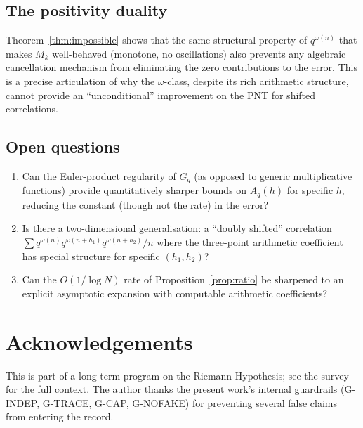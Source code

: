 \documentclass[11pt]{amsart}
\theoremstyle{definition}
\theoremstyle{remark}
\newcommand{\om}{\omega}
\begin{document}
\subsection{The positivity duality}

Theorem~\ref{thm:impossible} shows that the same structural property of $q^{\om(n)}$
that makes $M_k$ well-behaved (monotone, no oscillations) also prevents any algebraic
cancellation mechanism from eliminating the zero contributions to the error.
This is a precise articulation of why the $\om$-class, despite its rich arithmetic
structure, cannot provide an ``unconditional'' improvement on the PNT for shifted
correlations.

\subsection{Open questions}

\begin{enumerate}
\item Can the Euler-product regularity of $G_q$ (as opposed to generic multiplicative
  functions) provide quantitatively sharper bounds on $A_q(h)$ for specific $h$,
  reducing the constant (though not the rate) in the error?
\item \sloppy Is there a two-dimensional generalisation: a ``doubly shifted'' correlation
  $\sum q^{\om(n)}q^{\om(n+h_1)}q^{\om(n+h_2)}/n$ where the three-point arithmetic
  coefficient has special structure for specific $(h_1,h_2)$?
\item Can the $O(1/\log N)$ rate of Proposition~\ref{prop:ratio} be sharpened to
  an explicit asymptotic expansion with computable arithmetic coefficients?
\end{enumerate}

\section*{Acknowledgements}

This is part of a long-term program on the Riemann Hypothesis;
see the survey~\cite{RP1} for the full context.
The author thanks the present work's internal guardrails (G-INDEP, G-TRACE, G-CAP, G-NOFAKE)
for preventing several false claims from entering the record.
\end{document}
